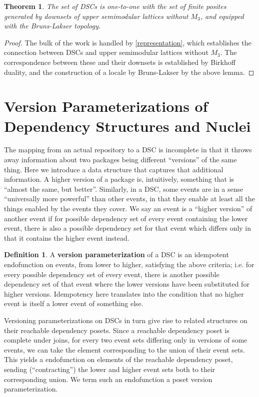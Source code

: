 \documentclass[hoptionsi,review,screen,format=acmsmall]{acmart}
\newtheorem{theorem}{Theorem}[section]
\theoremstyle{definition}
\newtheorem{definition}{Definition}[section]
\begin{document}
\begin{theorem}
The set of DSCs is one-to-one with the set of finite posites generated by downsets of upper semimodular lattices without \(M_3\), and equipped with the Bruns-Lakser topology.
\end{theorem}
\begin{proof}
The bulk of the work is handled by \ref{representation}, which establishes the connection between DSCs and upper semimodular lattices without \(M_3\). The correspondence between these and their downsets is established by Birkhoff duality, and the construction of a locale by Bruns-Lakser by the above lemma.
\end{proof}

\section{Version Parameterizations of Dependency Structures and Nuclei}

The mapping from an actual repository to a DSC is incomplete in that it throws away information about two packages being different ``versions'' of the same thing. Here we introduce a data structure that captures that additional information. A higher version of a package is, intuitively, something that is ``almost the same, but better''. Similarly, in a DSC, some events are in a sense ``universally more powerful'' than other events, in that they enable at least all the things enabled by the events they cover. We say an event is a ``higher version'' of another event if for possible dependency set of every event containing the lower event, there is also a possible dependency set for that event which differs only in that it contains the higher event instead.

\begin{definition}
A \textbf{version parameterization} of a DSC is an idempotent endofunction on events, from lower to higher, satisfying the above criteria; i.e. for every possible dependency set of every event, there is another possible dependency set of that event where the lower versions have been substituted for higher versions. Idempotency here translates into the condition that no higher event is itself a lower event of something else.
\end{definition}

Versioning parameterizations on DSCs in turn give rise to related structures on their reachable dependency posets. Since a reachable dependency poset is complete under joins, for every two event sets differing only in versions of some events, we can take the element corresponding to the union of their event sets. This yields a  endofunction on elements of the reachable dependency poset, sending (``contracting'') the lower and higher event sets both to their corresponding union. We term such an endofunction a poset version parameterization.
\end{document}
